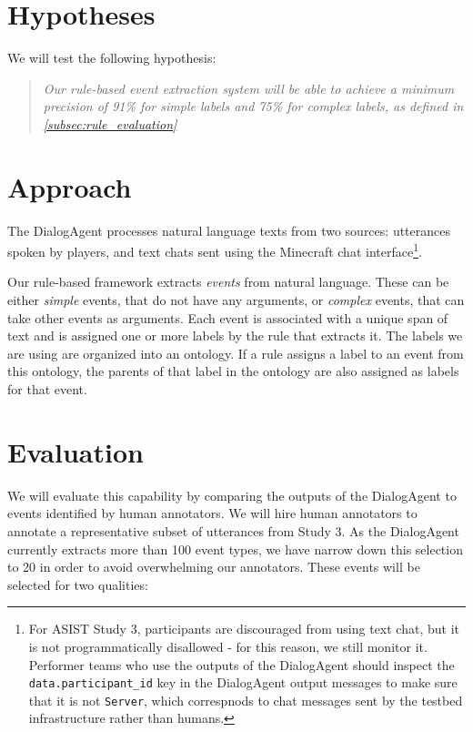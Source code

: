 \section{Hypotheses}

We will test the following hypothesis: 

\begin{quote}
    \itshape
    Our rule-based event extraction system will be able to achieve a minimum
    precision of 91\% for simple labels and 75\% for complex labels, as defined
    in \autoref{subsec:rule_evaluation}
\end{quote}

\section{Approach}

The DialogAgent processes natural language texts from two sources: utterances
spoken by players, and text chats sent using the Minecraft chat
interface\footnote{For ASIST Study 3, participants are discouraged from using
    text chat, but it is not programmatically disallowed - for this reason, we
    still monitor it. Performer teams who use the outputs of the DialogAgent
    should inspect the \texttt{data.participant\_id} key in the DialogAgent
    output messages to make sure that it is not \texttt{Server}, which
correspnods to chat messages sent by the testbed infrastructure rather than
humans.}.

Our rule-based framework extracts \emph{events} from natural language. These
can be either \emph{simple} events, that do not have any arguments, or
\emph{complex} events, that can take other events as arguments. Each event is
associated with a unique span of text and is assigned one or more labels by the
rule that extracts it. The labels we are using are organized into an ontology.
If a rule assigns a label to an event from this ontology, the parents of that
label in the ontology are also assigned as labels for that event.

\section{Evaluation}

We will evaluate this capability by comparing the outputs of the DialogAgent to
events identified by human annotators. We will hire human annotators to
annotate a representative subset of utterances from Study 3. As the DialogAgent
currently extracts more than 100 event types, we have narrow down this
selection to 20 in order to avoid overwhelming our annotators. These events
will be selected for two qualities:

